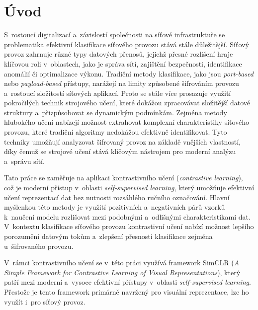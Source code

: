 
%

\chapter{Úvod}
S~rostoucí digitalizací a~závislostí společnosti na síťové infrastruktuře se problematika efektivní klasifikace síťového provozu stává stále důležitější. Síťový provoz zahrnuje různé typy datových přenosů, jejichž přesné rozlišení hraje klíčovou roli v~oblastech, jako je správa sítí, zajištění bezpečnosti, identifikace anomálií či optimalizace výkonu. Tradiční metody klasifikace, jako jsou \textit{port-based} nebo \textit{payload-based} přístupy, narážejí na limity způsobené šifrováním provozu a~rostoucí složitostí síťových aplikací. Proto se stále více prosazuje využití pokročilých technik strojového učení, které dokážou zpracovávat složitější datové struktury a~přizpůsobovat se dynamickým podmínkám. Zejména metody hlubokého učení nabízejí možnost extrahovat komplexní charakteristiky síťového provozu, které tradiční algoritmy nedokážou efektivně identifikovat. Tyto techniky umožňují analyzovat šifrovaný provoz na základě vnějších vlastností, díky čemuž se strojové učení stává klíčovým nástrojem pro moderní analýzu a~správu sítí.

Tato práce se zaměřuje na aplikaci kontrastivního učení (\textit{contrastive learning}), což je moderní přístup v~oblasti \textit{self-supervised learning}, který umožňuje efektivní učení reprezentací dat bez nutnosti rozsáhlého ručního označování. Hlavní myšlenkou této metody je využití pozitivních a~negativních párů vzorků k~naučení modelu rozlišovat mezi podobnými a~odlišnými charakteristikami dat. V~kontextu klasifikace síťového provozu kontrastivní učení nabízí možnost lepšího porozumění datovým tokům a~zlepšení přesnosti klasifikace zejména u~šifrovaného provozu.

V~rámci kontrastivního učení se v~této práci využívá framework SimCLR (\textit{A Simple Framework for Contrastive Learning of Visual Representations}), který patří mezi moderní a~vysoce efektivní přístupy v~oblasti \textit{self-supervised learning}. Přestože je tento framework primárně navržený pro visuální reprezentace, lze ho využít i~pro síťový provoz. 

